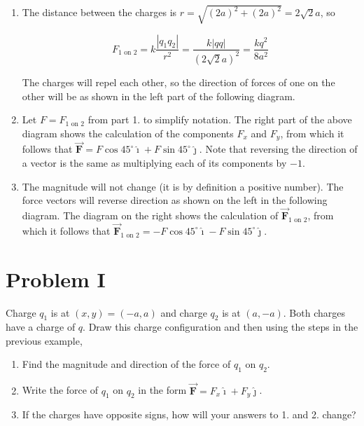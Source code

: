 \documentclass{article}
\renewcommand{\mbox}{\text}
\newcommand{\ihat}[0]{\hat{\boldsymbol{\imath}}}
\newcommand{\jhat}[0]{\hat{\boldsymbol{\jmath}}}
\newcommand{\bfvec}[1]{\vec{\mathbf{#1}}}
\begin{document}
\begin{enumerate}

  \item The distance between the charges is $r=\sqrt{(2a)^2+(2a)^2}=2\sqrt{2}a$, so

    \begin{equation}
    F_{1\mbox{ on } 2}=k\frac{|q_1q_2|}{r^2}=\frac{k|qq|}{(2\sqrt{2}a)^2}=\frac{kq^2}{8a^2}
    \end{equation}

        The charges will repel each other, so the direction of forces of one on the other will be as shown in the left part of the following diagram.

        

  \item Let $F = F_{1\mbox{ on } 2}$ from part 1. to simplify notation. The right part of the above diagram shows the calculation of the components $F_x$ and $F_y$, from which it follows that $\bfvec{F} = F\cos 45^\circ \ihat + F\sin 45^\circ \jhat$. Note that reversing the direction of a vector is the same as multiplying each of its components by $-1$.

  \item The magnitude will not change (it is by definition a positive number). The force vectors will reverse direction as shown on the left in the following diagram. The diagram on the right shows the calculation of $\bfvec{F}_{1\mbox{ on } 2}$, from which it follows that $\bfvec{F}_{1\mbox{ on } 2} = -F\cos 45^\circ \ihat - F\sin 45^\circ \jhat$.

        

\end{enumerate}

\section{Problem I}

Charge $q_1$ is at $(x,y)=(-a,a)$ and charge $q_2$ is at $(a, -a)$. Both charges have a charge of $q$. Draw this charge configuration and then using the steps in the previous example,

\begin{enumerate}

  \item Find the magnitude and direction of the force of $q_1$ on $q_2$.

  \item Write the force of $q_1$ on $q_2$ in the form $\bfvec{F}=F_x\ihat + F_y\jhat$.

  \item If the charges have opposite signs, how will your answers to 1. and 2. change?

\end{enumerate}
\end{document}
